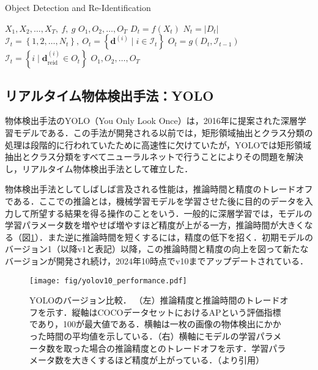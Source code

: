         \begin{algorithm}[t]
            \caption{Object Detection and Re-Identification}
            \label{alg:object_detection_and_reidentification}
            \begin{algorithmic}[1]
                \Require $X_1, X_2, \dots, X_T, ~f, ~g$
                \Ensure $O_1, O_2, \dots, O_T$
                    \State $D_t = f(X_t)$
                    \State $ N_t = \left|D_t\right|$
                        \State $\mathcal{I}_t = \left\{1, 2, \dots, N_t\right\}, ~ O_t = \left\{\bm{d}^{(i)} \mid i \in \mathcal{I}_t\right\}$
                    \Else
                        \State $O_t = g(D_t, \mathcal{I}_{t-1})$
                        \State $\mathcal{I}_t = \left\{i \mid \bm{d}_{\text{reid}}^{(i)} \in O_t\right\}$
                    \EndIf
                \EndFor
                \State \Return $O_1, O_2, \dots, O_T$
            \end{algorithmic}
        \end{algorithm}

    \subsection{リアルタイム物体検出手法：YOLO}
    \label{subsec:object_detection}

    物体検出手法のYOLO（You Only Look Once）\cite{redmon2016you, alif2024yolov1}は，2016年に提案された深層学習モデルである．この手法が開発される以前では，矩形領域抽出とクラス分類の処理は段階的に行われていた\cite{girshick2014rich,girshick2015fast,ren2016faster}ために高速性に欠けていたが，YOLOでは矩形領域抽出とクラス分類をすべてニューラルネットで行うことによりその問題を解決し，リアルタイム物体検出手法として確立した．

    物体検出手法としてしばしば言及される性能は，推論時間と精度のトレードオフである．ここでの推論とは，機械学習モデルを学習させた後に目的のデータを入力して所望する結果を得る操作のことをいう．一般的に深層学習では，モデルの学習パラメータ数を増やせば増やすほど精度が上がる一方，推論時間が大きくなる（図\ref{fig:yolo_tradeoff}）．また逆に推論時間を短くするには，精度の低下を招く．初期モデルのバージョン1（以降v1と表記）以降，この推論時間と精度の向上を図って新たなバージョンが開発され続け，2024年10時点でv10までアップデートされている．

    \begin{figure}[t]
        \centering
        \texttt{[image: fig/yolov10\_performance.pdf]}
        \caption[YOLOのバージョン比較]{YOLOのバージョン比較．
        （左）推論精度と推論時間のトレードオフを示す．縦軸はCOCOデータセットにおけるAPという評価指標であり，100が最大値である．横軸は一枚の画像の物体検出にかかった時間の平均値を示している．（右）横軸にモデルの学習パラメータ数を取った場合の推論精度とのトレードオフを示す．学習パラメータ数を大きくするほど精度が上がっている．（\cite{wang2024yolov10}より引用）}
        \label{fig:yolo_tradeoff}
    \end{figure}    

